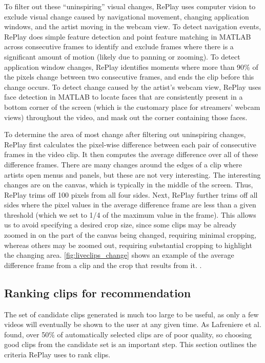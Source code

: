 To filter out these ``uninspiring'' visual changes, RePlay uses computer vision to exclude visual change caused by navigational movement, changing application windows, and the artist moving in the webcam view. To detect navigation events, RePlay does simple feature detection and point feature matching in MATLAB across consecutive frames to identify and exclude frames where there is a significant amount of motion (likely due to panning or zooming). To detect application window changes, RePlay identifies moments where more than 90\% of the pixels change between two consecutive frames, and ends the clip before this change occurs. To detect change caused by the artist's webcam view, RePlay uses face detection in MATLAB to locate faces that are consistently present in a bottom corner of the screen (which is the customary place for streamers' webcam views) throughout the video, and mask out the corner containing those faces.

To determine the area of most change after filtering out uninspiring changes, RePlay first calculates the pixel-wise difference between each pair of consecutive frames in the video clip. It then computes the average difference over all of these difference frames. There are many changes around the edges of a clip where artists open menus and panels, but these are not very interesting. The interesting changes are on the canvas, which is typically in the middle of the screen. Thus, RePlay trims off 100 pixels from all four sides. Next, RePlay further trims off all sides where the pixel values in the average difference frame are less than a given threshold (which we set to 1/4 of the maximum value in the frame). This allows us to avoid specifying a desired crop size, since some clips may be already zoomed in on the part of the canvas being changed, requiring minimal cropping, whereas others may be zoomed out, requiring substantial cropping to highlight the changing area. \autoref{fig:liveclips_change} shows an example of the average difference frame from a clip and the crop that results from it.
.

\subsection{Ranking clips for recommendation}
The set of candidate clips generated is much too large to be useful, as only a few videos will eventually be shown to the user at any given time. As Lafreniere et al. \cite{Lafreniere2014} found, over 50\% of automatically selected clips are of poor quality, so choosing good clips from the candidate set is an important step. This section outlines the criteria RePlay uses to rank clips.

